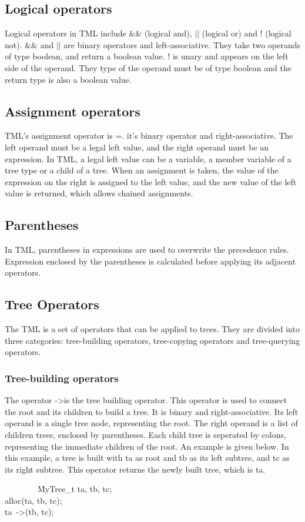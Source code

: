 \documentclass[12pt,psfig,a4]{article}
\begin{document}
\subsection{Logical operators}
Logical operators in TML include $\&\&$ (logical and), $||$ (logical or) and ! (logical not). \&\& and $||$ are binary operators and left-associative. They take two operands of type boolean, and return a boolean value. ! is unary and appears on the left side of the operand. They type of the operand must be of type boolean and the return type is also a boolean value.

\subsection{Assignment operators}
TML's assignment operator is =. it's binary operator and right-associative. The left operand must be a legal left value, and the right operand must be an expression. In TML, a legal left value can be a variable, a member variable of a tree type or a child of a tree. When an assignment is taken, the value of the expression on the right is assigned to the left value, and the new value of the left value is returned, which allows chained assignments. 

\subsection{Parentheses}
In TML, parentheses in expressions are used to overwrite the precedence rules. Expression enclosed by the parentheses is calculated before applying its adjacent operators.

\subsection{Tree Operators}
The TML is a set of operators that can be applied to trees. They are divided into three categories: tree-building operators, tree-copying operators and tree-querying operators.

\subsubsection{Tree-building operators}
The operator -\textgreater is the tree building operator. This operator is used to connect the root and its children to build a tree. It is binary and right-associative. Its left operand is a single tree node, representing the root. The right operand is a list of children trees, enclosed by parentheses. Each child tree is seperated by colons, representing the immediate children of the root. An example is given below. In this example, a tree is built with ta as root and tb as its left subtree, and tc as its right subtree. This operator returns the newly built tree, which is ta.
\begin{code}
\begin{tabbing}
~~~~~~~~\= MyTree\_t ta, tb, tc;\\
\> alloc(ta, tb, tc);\\
\> ta~-\textgreater(tb, tc);
\end{tabbing}
\end{code}
\end{document}
